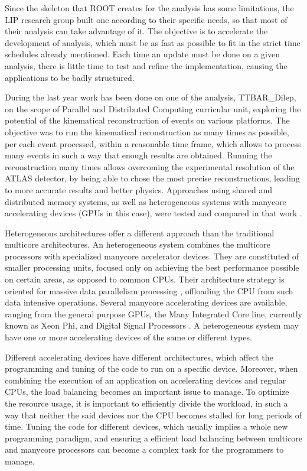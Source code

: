 Since the skeleton that ROOT creates for the analysis has some limitations, the LIP research group built one according to their specific needs, so that most of their analysis can take advantage of it. The objective is to accelerate the development of analysis, which must be as fast as possible to fit in the strict time schedules already mentioned. Each time an update must be done on a given analysis, there is little time to test and refine the implementation, causing the applications to be badly structured.

During the last year work has been done on one of the analysis, TTBAR\_Dilep, on the scope of Parallel and Distributed Computing curricular unit, exploring the potential of the kinematical reconstruction of events on various platforms. The objective was to run the kinematical reconstruction as many times as possible, per each event processed, within a reasonable time frame, which allows to process many events in such a way that enough results are obtained. Running the reconstruction many times allows overcoming the experimental resolution of the ATLAS detector, by being able to chose the most precise reconstructions, leading to more accurate results and better physics. Approaches using shared and distributed memory systems, as well as heterogeneous systems with manycore accelerating devices (GPUs in this case), were tested and compared in that work \cite{LIP:PI}.

Heterogeneous architectures offer a different approach than the traditional multicore architectures. An heterogeneous system combines the multicore processors with specialized manycore accelerator devices. They are constituted of smaller processing units, focused only on achieving the best performance possible on certain areas, as opposed to common CPUs. Their architecture strategy is oriented for massive data parallelism processing \cite{Hennessy:Patterson:2012:CAQA}, offloading the CPU from such data intensive operations. Several manycore accelerating devices are available, ranging from the general purpose GPUs, the \intel Many Integrated Core line, currently known as \intel Xeon Phi, and Digital Signal Processors \cite{NVIDIA:GPGPU, Intel:MIC, Texas:DSP}. A heterogeneous system may have one or more accelerating devices of the same or different types.

Different accelerating devices have different architectures, which affect the programming and tuning of the code to run on a specific device. Moreover, when combining the execution of an application on accelerating devices and regular CPUs, the load balancing becomes an important issue to manage. To optimize the resource usage, it is important to efficiently divide the workload, in such a way that neither the said devices nor the CPU becomes stalled for long periods of time. Tuning the code for different devices, which usually implies a whole new programming paradigm, and ensuring a efficient load balancing between multicore and manycore processors can become a complex task for the programmers to manage.

